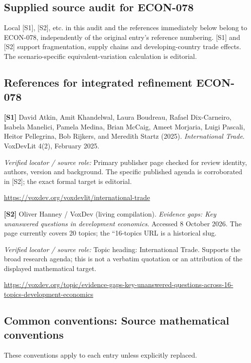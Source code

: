 \documentclass[11pt,a4paper]{article}
\begin{document}
\subsection*{Supplied source audit for ECON-078}
Local [S1], [S2], etc. in this audit and the references immediately below
belong to ECON-078, independently of the original entry's reference numbering.
[S1] and [S2] support fragmentation, supply chains and developing-country trade effects. The scenario-specific equivalent-variation calculation is editorial.
\subsection*{References for integrated refinement ECON-078}
{\footnotesize\raggedright
\par\noindent\textbf{[S1]} David Atkin, Amit Khandelwal, Laura Boudreau, Rafael Dix-Carneiro, Isabela Manelici, Pamela Medina, Brian McCaig, Ameet Morjaria, Luigi Pascali, Heitor Pellegrina, Bob Rijkers, and Meredith Startz (2025). \emph{International Trade}. VoxDevLit 4(2), February 2025.\par \textit{Verified locator / source role:} Primary publisher page checked for review identity, authors, version and background. The specific published agenda is corroborated in [S2]; the exact formal target is editorial.\par \url{https://voxdev.org/voxdevlit/international-trade}\par\smallskip
\par\noindent\textbf{[S2]} Oliver Hanney / VoxDev (living compilation). \emph{Evidence gaps: Key unanswered questions in development economics}. Accessed 8 October 2026. The page currently covers 20 topics; the ``16-topics URL is a historical slug.\par \textit{Verified locator / source role:} Topic heading: International Trade. Supports the broad research agenda; this is not a verbatim quotation or an attribution of the displayed mathematical target.\par \url{https://voxdev.org/topic/evidence-gaps-key-unanswered-questions-across-16-topics-development-economics}\par\smallskip
}

\subsection*{Common conventions: Source mathematical conventions}

These conventions apply to each entry unless explicitly replaced.
\end{document}
